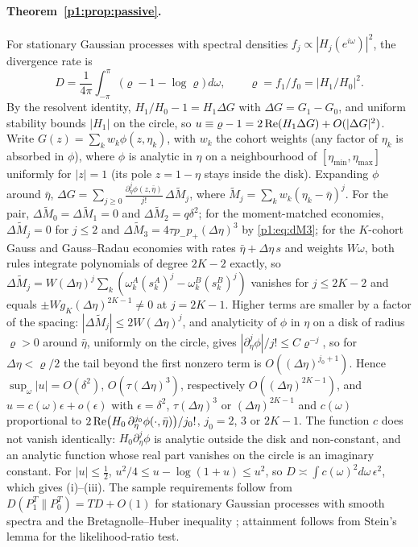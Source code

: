 \paragraph{Theorem~\ref{p1:prop:passive}.} For stationary Gaussian processes with spectral densities $f_j\propto|H_j(e^{i\omega})|^2$, the divergence rate is
\[
D=\frac1{4\pi}\int_{-\pi}^{\pi}\bigl(\varrho-1-\log\varrho\bigr)\,d\omega,\qquad \varrho=f_1/f_0=|H_1/H_0|^2 .
\] By the resolvent identity, $H_1/H_0-1=H_1\Delta G$ with $\Delta G=G_1-G_0$, and uniform stability bounds $|H_1|$ on the circle, so $u\equiv\varrho-1=2\,{\rm Re}(H_1\Delta G)+O(|\Delta G|^2)$. Write $G(z)=\sum_kw_k\phi(z,\eta_k)$, with $w_k$ the cohort weights (any factor of $\eta_k$ is absorbed in $\phi$), where $\phi$ is analytic in $\eta$ on a neighbourhood of $[\eta_{\min},\eta_{\max}]$ uniformly for $|z|=1$ (its pole $z=1-\eta$ stays inside the disk). Expanding $\phi$ around $\bar\eta$, $\Delta G=\sum_{j\ge0}\frac{\partial_\eta^j\phi(z,\bar\eta)}{j!}\,\Delta\tilde M_j$, where $\tilde M_j=\sum_kw_k(\eta_k-\bar\eta)^j$. For the pair, $\Delta\tilde M_0=\Delta\tilde M_1=0$ and $\Delta\tilde M_2=q\delta^2$; for the moment-matched economies, $\Delta\tilde M_j=0$ for $j\le2$ and $\Delta\tilde M_3=4\tau p_-p_+(\Delta\eta)^3$ by \eqref{p1:eq:dM3}; for the $K$-cohort Gauss and Gauss--Radau economies with rates $\bar\eta+\Delta\eta\,s$ and weights $W\omega$, both rules integrate polynomials of degree $2K-2$ exactly, so $\Delta\tilde M_j=W(\Delta\eta)^j\sum_k(\omega^A_k(s^A_k)^j-\omega^B_k(s^B_k)^j)$ vanishes for $j\le2K-2$ and equals $\pm Wg_K(\Delta\eta)^{2K-1}\neq0$ at $j=2K-1$. Higher terms are smaller by a factor of the spacing: $|\Delta\tilde M_j|\le2W(\Delta\eta)^j$, and analyticity of $\phi$ in $\eta$ on a disk of radius $\varrho>0$ around $\bar\eta$, uniformly on the circle, gives $|\partial_\eta^j\phi|/j!\le C\varrho^{-j}$, so for $\Delta\eta<\varrho/2$ the tail beyond the first nonzero term is $O((\Delta\eta)^{j_0+1})$. Hence $\sup_\omega|u|=O(\delta^2)$, $O(\tau(\Delta\eta)^3)$, respectively $O((\Delta\eta)^{2K-1})$, and $u=c(\omega)\epsilon+o(\epsilon)$ with $\epsilon=\delta^2$, $\tau(\Delta\eta)^3$ or $(\Delta\eta)^{2K-1}$ and $c(\omega)$ proportional to $2\,{\rm Re}\bigl(H_0\,\partial^{j_0}_\eta\phi(\cdot,\bar\eta)\bigr)/j_0!$, $j_0=2$, $3$ or $2K-1$. The function $c$ does not vanish identically: $H_0\partial^j_\eta\phi$ is analytic outside the disk and non-constant, and an analytic function whose real part vanishes on the circle is an imaginary constant. For $|u|\le\frac12$, $u^2/4\le u-\log(1+u)\le u^2$, so $D\asymp\int c(\omega)^2d\omega\,\epsilon^2$, which gives (i)--(iii). The sample requirements follow from $D(P_1^{T}\|P_0^{T})=TD+O(1)$ for stationary Gaussian processes with smooth spectra and the Bretagnolle--Huber inequality \citep[Lemma 2.6]{p1:tsybakov2009}; attainment follows from Stein's lemma for the likelihood-ratio test.

